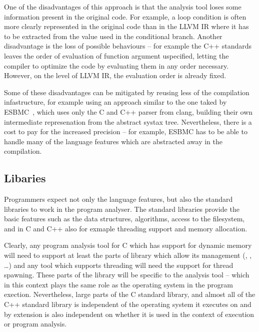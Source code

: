 One of the disadvantages of this approach is that the analysis tool loses some
information present in the original code.
For example, a loop condition is often more clearly represented in the original
code than in the LLVM IR where it has to be extracted from the value used in
the conditional branch.
Another disadvantage is the loss of possible behaviours -- for example the C++ standards leaves the order of evaluation of function argument uspecified, letting the compiler to optimize the code by evaluating them in any order necessary.
However, on the level of LLVM IR, the evaluation order is already fixed.

Some of these disadvantages can be mitigated by reusing less of the compilation
infastructure, for example using an approach similar to the one taked by
ESBMC~, which uses only the C and C++ parser from clang,
building their own intermediate represenation from the abstract systax tree.
Nevertheless, there is a cost to pay for the increased precision -- for example, ESBMC has to be able to handle many of the language features which are abstracted away in the compilation.

\subsection{Libaries}

Programmers expect not only the language features, but also the standard
libraries to work in the program analyser.
The standard libraries provide the basic features such as the data structures, algorithms, access to the filesystem, and in C and C++ also for exmaple threading support and memory allocation.

Clearly, any program analysis tool for C which has support for dynamic memory
will need to support at least the parts of library which allow its management
(, , …) and any tool which supports threading will need
the support for thread spawning.
These parts of the library will be specific to the analysis tool -- which in
this context plays the same role as the operating system in the program
exection.
Nevertheless, large parts of the C standard library, and almost all of the C++
standard library is independent of the operating system it executes on and by
extension is also independent on whether it is used in the context of execution
or program analysis.

